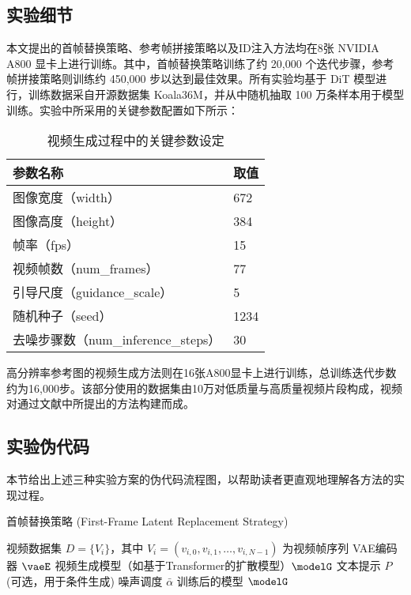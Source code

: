 \cleardoublepage

{
    \appendixsubsecmajornumbering
    \subsection{实验细节}
    本文提出的首帧替换策略、参考帧拼接策略以及ID注入方法均在8张 NVIDIA A800 显卡上进行训练。其中，首帧替换策略训练了约 20,000 个迭代步骤，参考帧拼接策略则训练约 450,000 步以达到最佳效果。所有实验均基于 DiT 模型进行，训练数据采自开源数据集 Koala36M，并从中随机抽取 100 万条样本用于模型训练。实验中所采用的关键参数配置如下所示：

\begin{table}[h]
\centering
\caption{视频生成过程中的关键参数设定}
\begin{tabular}{ll}
\toprule
\textbf{参数名称} & \textbf{取值} \\
\midrule
图像宽度（width） & 672 \\
图像高度（height） & 384 \\
帧率（fps） & 15 \\
视频帧数（num\_frames） & 77 \\
引导尺度（guidance\_scale） & 5 \\
随机种子（seed） & 1234 \\
去噪步骤数（num\_inference\_steps） & 30 \\
\bottomrule
\end{tabular}
\label{tab:video-gen-params}
\end{table}
    高分辨率参考图的视频生成方法则在16张A800显卡上进行训练，总训练迭代步数约为16,000步。该部分使用的数据集由10万对低质量与高质量视频片段构成，视频对通过文献\cite{wang2021real}中所提出的方法构建而成。

    \subsection{实验伪代码}

    本节给出上述三种实验方案的伪代码流程图，以帮助读者更直观地理解各方法的实现过程。


{\small
\begin{algorithm}
    \setlength{\baselineskip}{0.9\baselineskip}
    \caption{首帧替换策略 (First-Frame Latent Replacement Strategy)}
    \label{alg:first_frame_replacement}
    \begin{algorithmic}[1]
    \Require 
        \Statex 视频数据集 $D = \{V_i\}$，其中 $V_i = (v_{i,0}, v_{i,1}, \dots, v_{i,N-1})$ 为视频帧序列
        \Statex VAE编码器 $\vaeE$
        \Statex 视频生成模型（如基于Transformer的扩散模型）$\modelG$
        \Statex 文本提示 $P$ (可选，用于条件生成)
        \Statex 噪声调度 $\bar{\alpha}$
    \Ensure 训练后的模型 $\modelG$
    

\end{algorithmic}
\end{algorithm}}}
